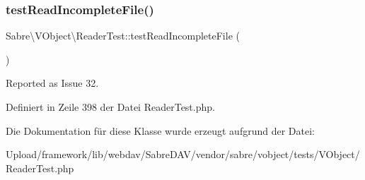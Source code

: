 \subsubsection{\texorpdfstring{test\+Read\+Incomplete\+File()}{testReadIncompleteFile()}}
{\footnotesize\ttfamily Sabre\textbackslash{}\+V\+Object\textbackslash{}\+Reader\+Test\+::test\+Read\+Incomplete\+File (\begin{DoxyParamCaption}{ }\end{DoxyParamCaption})}

Reported as Issue 32.

Definiert in Zeile 398 der Datei Reader\+Test.\+php.



Die Dokumentation für diese Klasse wurde erzeugt aufgrund der Datei\+:\begin{DoxyCompactItemize}
\item 
Upload/framework/lib/webdav/\+Sabre\+D\+A\+V/vendor/sabre/vobject/tests/\+V\+Object/Reader\+Test.\+php\end{DoxyCompactItemize}
